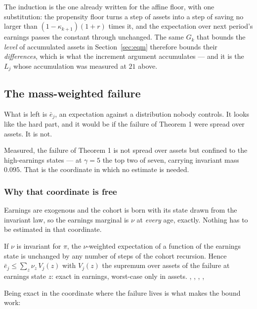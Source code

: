 The induction is the one already written for the affine floor, with one substitution: the propensity
floor turns a step of assets into a step of saving no larger than $(1-\kappa_{k+1})(1+r)$ times it,
and the expectation over next period's earnings passes the constant through unchanged. The same $G_k$
that bounds the \emph{level} of accumulated assets in Section~\ref{sec:eqm} therefore bounds their
\emph{differences}, which is what the increment argument accumulates --- and it is the $L_j$ whose
accumulation was measured at $21$ above.

\subsection{The mass-weighted failure}

What is left is $\bar e_j$, an expectation against a distribution nobody controls. It looks like the
hard part, and it would be if the failure of Theorem 1 were spread over assets. It is not.

Measured, the failure of Theorem 1 is not spread over assets but confined to the
high-earnings states --- at $\gamma=5$ the top two of seven, carrying invariant mass $0.095$.
That is the coordinate in which no estimate is needed.

\subsubsection*{Why that coordinate is free}

Earnings are exogenous and the cohort is born with its state drawn from the invariant law, so the
earnings marginal is $\nu$ at \emph{every} age, exactly. Nothing has to be estimated in that
coordinate.

\begin{theorem}\label{thm:marginal}
If $\nu$ is invariant for $\pi$, the $\nu$-weighted expectation of a function of the earnings state
is unchanged by any number of steps of the cohort recursion. Hence
$\bar e_j\le\sum_z\nu_z\,V_j(z)$ with $V_j(z)$ the supremum over assets of the failure at earnings
state $z$: exact in earnings, worst-case only in assets.
, ,
, ,
\end{theorem}

Being exact in the coordinate where the failure lives is what makes the bound work:

